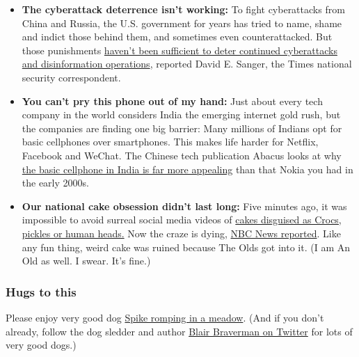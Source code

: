 \begin{itemize}
\item
  \textbf{The cyberattack deterrence isn't working:} To fight
  cyberattacks from China and Russia, the U.S. government for years has
  tried to name, shame and indict those behind them, and sometimes even
  counterattacked. But those punishments
  \href{https://www.nytimes3xbfgragh.onion/2020/07/22/us/politics/china-russia-trump-cyberattacks.html}{haven't
  been sufficient to deter continued cyberattacks and disinformation
  operations}, reported David E. Sanger, the Times national security
  correspondent.
\item
  \textbf{You can't pry this phone out of my hand:} Just about every
  tech company in the world considers India the emerging internet gold
  rush, but the companies are finding one big barrier: Many millions of
  Indians opt for basic cellphones over smartphones. This makes life
  harder for Netflix, Facebook and WeChat. The Chinese tech publication
  Abacus looks at why
  \href{https://www.scmp.com/abacus/tech/article/3093597/can-google-and-jio-convert-indias-feature-phone-diehards-android?utm_medium=email\&utm_source=mailchimp\&utm_campaign=enlz-abacusnews_chatbox\&utm_content=20200722\&MCUID=91b7d58ca3\&MCCampaignID=88e0c9f17d\&MCAccountID=3775521f5f542047246d9c827\&tc=18}{the
  basic cellphone in India is far more appealing} than that Nokia you
  had in the early 2000s.
\item
  \textbf{Our national cake obsession didn't last long:} Five minutes
  ago, it was impossible to avoid surreal social media videos of
  \href{https://www.nytimes3xbfgragh.onion/2020/07/14/style/what-is-the-cake-meme.html}{cakes
  disguised as Crocs, pickles or human heads.} Now the craze is dying,
  \href{https://www.nbcnews.com/pop-culture/pop-culture-news/internet-went-crazy-over-cake-going-mainstream-can-end-trend-n1234588}{NBC
  News reported}. Like any fun thing, weird cake was ruined because The
  Olds got into it. (I am An Old as well. I swear. It's fine.)
\end{itemize}

\hypertarget{hugs-to-this}{%
\subsubsection{Hugs to this}\label{hugs-to-this}}

Please enjoy very good dog
\href{https://twitter.com/BlairBraverman/status/1286085108005507077}{Spike
romping in a meadow}. (And if you don't already, follow the dog sledder
and author \href{https://twitter.com/BlairBraverman}{Blair Braverman on
Twitter} for lots of very good dogs.)

